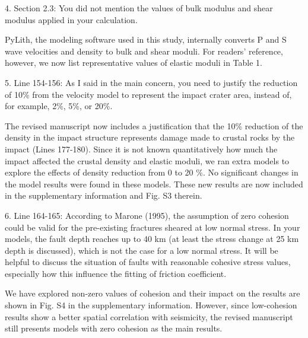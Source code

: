 \documentclass[12pt]{article}
\begin{document}
\begin{response}{4. Section 2.3: You did not mention the values of bulk modulus and shear modulus applied in your calculation.}

  PyLith, the modeling software used in this study, internally converts P and S wave velocities and density to bulk and shear moduli. For readers' reference, however, we now list representative values of elastic moduli in Table 1. 
\end{response}

\begin{response}{5. Line 154-156: As I said in the main concern, you need to justify the reduction of 10\% from the velocity model to represent the impact crater area, instead of, for example, 2\%, 5\%, or 20\%.}

  The revised manuscript now includes a justification that the 10\% reduction of the density in the impact structure represents damage made to crustal rocks by the impact (Lines 177-180). Since it is not known quantitatively how much the impact affected the crustal density and elastic moduli, we ran extra models to explore the effects of density reduction from 0 to 20 \%. No significant changes in the model results were found in these models. These new results are now included in the supplementary information and Fig. S3 therein.
\end{response}

\begin{response}{6. Line 164-165: According to Marone (1995), the assumption of zero cohesion could be valid for the pre-existing fractures sheared at low normal stress. In your models, the fault depth reaches up to 40 km (at least the stress change at 25 km depth is discussed), which is not the case for a low normal stress. It will be helpful to discuss the situation of faults with reasonable cohesive stress values, especially how this influence the fitting of friction coefficient.}

    
    We have explored non-zero values of cohesion and their impact on the results are shown in Fig. S4 in the supplementary information. However, since low-cohesion results show a better spatial correlation with seismicity, the revised manuscript still presents models with zero cohesion as the main results.
    
\end{response}
\end{document}
